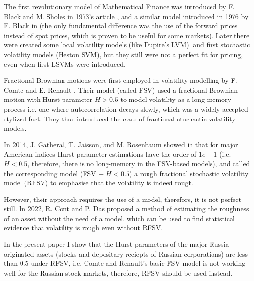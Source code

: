 The first revolutionary model of Mathematical Finance was introduced by F. Black and
M. Sholes in 1973's article \cite{BlackSholes1973}, and a similar model introduced in
1976 by F. Black in \cite{Black1976} (the only fundamental difference was the use of 
the forward prices instead of spot prices, which is proven to be useful for some markets). 
Later there were created some local volatility models (like Dupire's LVM), and first 
stochastic volatility models (Heston SVM), but they still were not a perfect fit for pricing, 
even when first LSVMs were introduced.

Fractional Brownian motions were first employed in volatility modelling by F. Comte and 
E. Renault \cite{ComteRenault1998}. Their model (called FSV) used a fractional Brownian 
motion with Hurst parameter $H > 0.5$ to model volatility as a long-memory process i.e. 
one where autocorrelation decays slowly, which was a widely accepted stylized fact. They 
thus introduced the class of fractional stochastic volatility models.

In 2014, J. Gatheral, T. Jaisson, and M. Rosenbaum showed in \cite{GatheralRosenbaum2014} 
that for major American indices Hurst parameter estimations have the order of $1e-1$ 
(i.e. $H < 0.5$, therefore, there is no long-memory in the FSV-based models), and called 
the corresponding model (FSV + $H < 0.5$) a rough fractional stochastic volatility model 
(RFSV) to emphasise that the volatility is indeed rough.

However, their approach requires the use of a model, therefore, it is not perfect still.
In 2022, R. Cont and P. Das \cite{Cont2022} proposed a method of estimating the roughness of 
an asset without the need of a model, which can be used to find statistical evidence that
volatility is rough even without RFSV.

In the present paper I show that the Hurst parameters of the major Russia-originated 
assets (stocks and depositary reciepts of Russian corporations) are less than $0.5$ under RFSV, 
i.e. Comte and Renault's basic FSV model is not working well for the Russian stock markets, 
therefore, RFSV should be used instead.